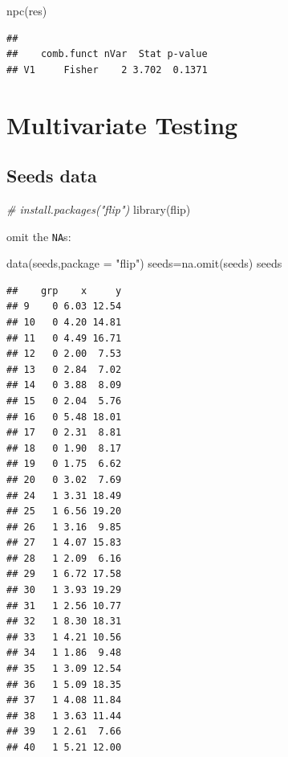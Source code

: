 \documentclass[
]{article}
\newenvironment{Shaded}{\begin{snugshade}}{\end{snugshade}}
\newcommand{\AttributeTok}[1]{\textcolor[rgb]{0.77,0.63,0.00}{#1}}
\newcommand{\CommentTok}[1]{\textcolor[rgb]{0.56,0.35,0.01}{\textit{#1}}}
\newcommand{\FunctionTok}[1]{\textcolor[rgb]{0.00,0.00,0.00}{#1}}
\newcommand{\NormalTok}[1]{#1}
\newcommand{\OtherTok}[1]{\textcolor[rgb]{0.56,0.35,0.01}{#1}}
\newcommand{\StringTok}[1]{\textcolor[rgb]{0.31,0.60,0.02}{#1}}
\begin{document}
\begin{Shaded}
\begin{Highlighting}[]
\FunctionTok{npc}\NormalTok{(res)}
\end{Highlighting}
\end{Shaded}

\begin{verbatim}
## 
##    comb.funct nVar  Stat p-value
## V1     Fisher    2 3.702  0.1371
\end{verbatim}

\hypertarget{multivariate-testing}{%
\section{Multivariate Testing}\label{multivariate-testing}}

\hypertarget{seeds-data}{%
\subsection{Seeds data}\label{seeds-data}}

\begin{Shaded}
\begin{Highlighting}[]
\CommentTok{\# install.packages("flip")}
\FunctionTok{library}\NormalTok{(flip)}
\end{Highlighting}
\end{Shaded}

omit the \texttt{NA}s:

\begin{Shaded}
\begin{Highlighting}[]
\FunctionTok{data}\NormalTok{(seeds,}\AttributeTok{package =} \StringTok{"flip"}\NormalTok{)}
\NormalTok{seeds}\OtherTok{=}\FunctionTok{na.omit}\NormalTok{(seeds)}
\NormalTok{seeds}
\end{Highlighting}
\end{Shaded}

\begin{verbatim}
##    grp    x     y
## 9    0 6.03 12.54
## 10   0 4.20 14.81
## 11   0 4.49 16.71
## 12   0 2.00  7.53
## 13   0 2.84  7.02
## 14   0 3.88  8.09
## 15   0 2.04  5.76
## 16   0 5.48 18.01
## 17   0 2.31  8.81
## 18   0 1.90  8.17
## 19   0 1.75  6.62
## 20   0 3.02  7.69
## 24   1 3.31 18.49
## 25   1 6.56 19.20
## 26   1 3.16  9.85
## 27   1 4.07 15.83
## 28   1 2.09  6.16
## 29   1 6.72 17.58
## 30   1 3.93 19.29
## 31   1 2.56 10.77
## 32   1 8.30 18.31
## 33   1 4.21 10.56
## 34   1 1.86  9.48
## 35   1 3.09 12.54
## 36   1 5.09 18.35
## 37   1 4.08 11.84
## 38   1 3.63 11.44
## 39   1 2.61  7.66
## 40   1 5.21 12.00
\end{verbatim}
\end{document}
